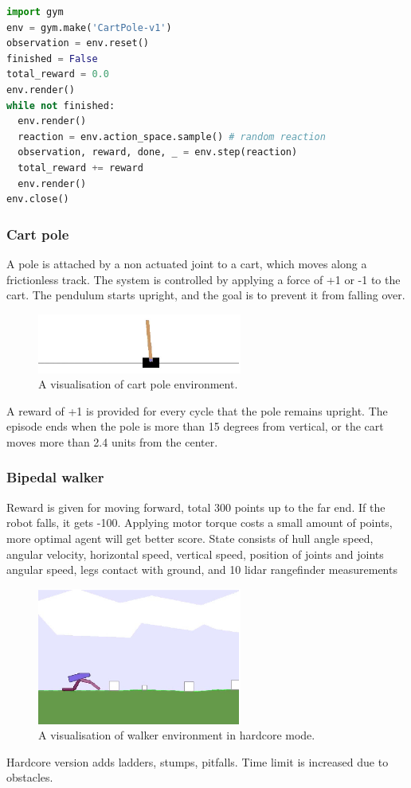 \begin{lstlisting}[frame=single, language=Python, caption={A simple simulation in Gym}]
import gym
env = gym.make('CartPole-v1')
observation = env.reset()
finished = False
total_reward = 0.0
env.render()
while not finished:
  env.render()
  reaction = env.action_space.sample() # random reaction
  observation, reward, done, _ = env.step(reaction)
  total_reward += reward
  env.render()
env.close()
\end{lstlisting}

\FloatBarrier
\subsubsection{Cart pole}
A pole is attached by a non actuated joint to a cart, which moves along a frictionless track.
The system is controlled by applying a force of +1 or -1 to the cart.
The pendulum starts upright, and the goal is to prevent it from falling over. 
\begin{figure}[htb] 
	\centering
	\includegraphics[width=0.6\textwidth]{figures/cartpole}
	\caption{A visualisation of cart pole environment.}
	\label{fig:cartpole}
\end{figure}
A reward of +1 is provided for every cycle that the pole remains upright.
The episode ends when the pole is more than 15 degrees from vertical, or the cart moves more 
than 2.4 units from the center.

\FloatBarrier
\subsubsection{Bipedal walker}
Reward is given for moving forward, total 300 points up to the far end. 
If the robot falls, it gets -100. Applying motor torque costs a small amount of points, 
more optimal agent will get better score.
State consists of hull angle speed, angular velocity, horizontal speed, vertical speed,
position of joints and joints angular speed, legs contact with ground, and 10 lidar 
rangefinder measurements
\begin{figure}[htb] 
	\centering
	\includegraphics[width=0.6\textwidth]{figures/walker}
	\caption{A visualisation of walker environment in hardcore mode.}
	\label{fig:walker}
\end{figure}
Hardcore version adds ladders, stumps, pitfalls. Time limit is increased due to obstacles. 

